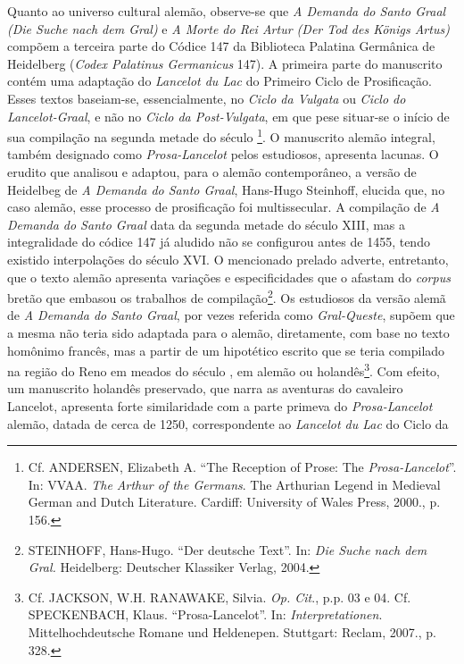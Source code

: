 Quanto ao universo cultural alemão, observe-se que  \textit{A Demanda do Santo
Graal} \textit{(Die Suche nach dem Gral) }e \textit{A Morte do Rei Artur (Der
Tod des Königs Artus)} compõem a terceira parte do Códice 147 da Biblioteca
Palatina Germânica de Heidelberg (\textit{Codex Palatinus Germanicus} 147). A
primeira parte do manuscrito contém uma adaptação do \textit{Lancelot du Lac}
do Primeiro Ciclo de Prosificação. Esses textos baseiam-se, essencialmente, no
\textit{Ciclo da Vulgata} ou \textit{Ciclo do Lancelot-Graal}, e não no
\textit{Ciclo da Post-Vulgata}, em que pese situar-se o início de sua
compilação na segunda metade do século \footnote{ Cf. ANDERSEN, Elizabeth
A. “The Reception of Prose: The \textit{Prosa-Lancelot}”. In: VVAA. \textit{The
Arthur of the Germans}. The Arthurian Legend in Medieval German and Dutch
Literature. Cardiff: University of Wales Press, 2000., p. 156. }. O manuscrito
alemão integral, também designado como \textit{Prosa-Lancelot} pelos
estudiosos, apresenta lacunas. O erudito que analisou e adaptou, para o alemão
contemporâneo, a versão de Heidelbeg de\textit{ A Demanda do Santo Graal},
Hans-Hugo Steinhoff, elucida que, no caso alemão, esse processo de prosificação
foi multissecular. A compilação de \textit{A Demanda do Santo Graal} data da
segunda metade do século XIII, mas a integralidade do códice 147 já aludido não
se configurou antes de 1455, tendo existido interpolações do século XVI. O
mencionado prelado adverte, entretanto, que o texto alemão apresenta variações
e especificidades que o afastam do \textit{corpus} bretão que embasou os
trabalhos de compilação\footnote{ STEINHOFF, Hans-Hugo. “Der deutsche Text”.
In: \textit{Die Suche nach dem Gral. }Heidelberg: Deutscher Klassiker Verlag,
2004.  }. Os estudiosos da versão alemã de \textit{A Demanda do Santo Graal},
por vezes referida como \textit{Gral-Queste}, supõem que a mesma não teria sido
adaptada para o alemão, diretamente, com base no texto homônimo francês, mas a
partir de um hipotético escrito que se teria compilado na região do Reno em
meados do século , em alemão ou holandês\footnote{ Cf. JACKSON, W.H.
RANAWAKE, Silvia. \textit{Op. Cit}., p.p. 03 e 04. Cf. SPECKENBACH, Klaus.
“Prosa-Lancelot”. In: \textit{Interpretationen}. Mittelhochdeutsche Romane und
Heldenepen. Stuttgart: Reclam, 2007., p. 328. }. Com efeito, um manuscrito
holandês preservado, que narra as aventuras do cavaleiro Lancelot, apresenta
forte similaridade com a parte primeva do \textit{Prosa-Lancelot} alemão,
datada de cerca de 1250, correspondente ao \textit{Lancelot du Lac} do Ciclo da
